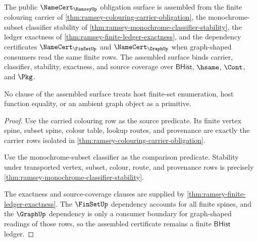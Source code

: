 \begin{theorem}
\label{thm:ramsey-namecert-obligation-assembly}
The public $\NameCert_{\RamseyUp}$ obligation surface is assembled from the
finite colouring carrier of
\autoref{thm:ramsey-colouring-carrier-obligation}, the monochrome-subset
classifier stability of
\autoref{thm:ramsey-monochrome-classifier-stability}, the ledger exactness of
\autoref{thm:ramsey-finite-ledger-exactness}, and the dependency certificates
$\NameCert_{\FinSetUp}$ and $\NameCert_{\GraphUp}$ when graph-shaped consumers
read the same finite rows. The assembled surface binds carrier, classifier,
stability, exactness, and source coverage over $\mathsf{BHist}$, $\hsame$,
$\Cont$, and $\Pkg$.

No clause of the assembled surface treats host finite-set enumeration, host
function equality, or an ambient graph object as a primitive.
\end{theorem}
\begin{proof}
Use the carried colouring row as the source predicate. Its finite vertex
spine, subset spine, colour table, lookup routes, and provenance are exactly
the carrier rows isolated in
\autoref{thm:ramsey-colouring-carrier-obligation}.

Use the monochrome-subset classifier as the comparison predicate. Stability
under transported vertex, subset, colour, route, and provenance rows is
precisely \autoref{thm:ramsey-monochrome-classifier-stability}.

The exactness and source-coverage clauses are supplied by
\autoref{thm:ramsey-finite-ledger-exactness}. The $\FinSetUp$ dependency
accounts for all finite spines, and the $\GraphUp$ dependency is only a
consumer boundary for graph-shaped readings of those rows, so the assembled
certificate remains a finite $\mathsf{BHist}$ ledger.
\end{proof}

